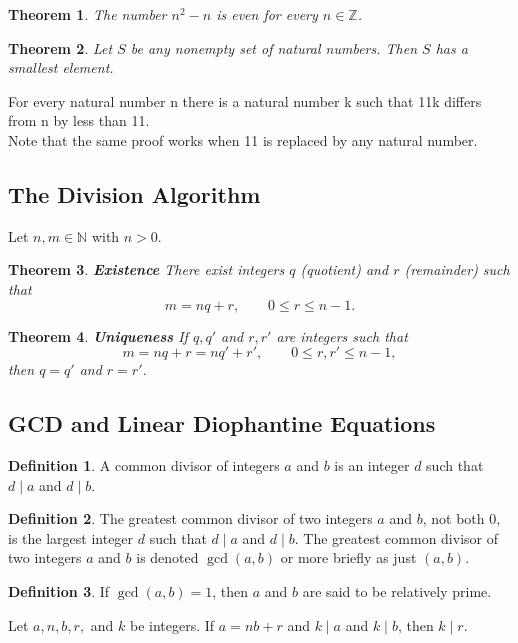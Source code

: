 \documentclass{article}
\newtheorem*{theorem*}{Theorem}
\theoremstyle{definition}
\newtheorem*{definition*}{Definition}
\newenvironment{manualtheorem}[1]{%
  \renewcommand{\thetheorem}{#1}%
  \theorem%
}{%
  \endtheorem%
}
\begin{document}
\begin{theorem*}
	The number $n^2 - n$ is even for every $n \in \mathbb{Z}$.
\end{theorem*}

\begin{theorem*}
	Let $S$ be any nonempty set of natural numbers. Then $S$ has a smallest element.
\end{theorem*}

\begin{manualtheorem}{1.27}
For every natural number n there is a natural number k such that 11k
differs from n by less than 11. \\Note that the same proof works when 11 is replaced by any natural number.
\end{manualtheorem}

\subsection{The Division Algorithm}
Let $n, m \in \mathbb{N}$ with $n > 0$.
\begin{theorem*}
	\textbf{Existence}
	There exist integers $q$ (quotient) and $r$ (remainder) such that
	\[
		m = nq + r, \qquad 0 \leq r \leq n - 1.
	\]
\end{theorem*}

\begin{theorem*}
	\textbf{Uniqueness}
	If $q, q'$ and $r, r'$ are integers such that
	\[
		m = nq + r = nq' + r', \qquad 0 \leq r, r' \leq n - 1,
	\]
	then $q = q'$ and $r = r'$.
\end{theorem*}


\subsection{GCD and Linear Diophantine Equations}

\begin{definition*}
	A common divisor of integers $a$ and $b$ is an integer $d$ such that $d \mid a$ and $d \mid b$.
\end{definition*}

\begin{definition*}
	The greatest common divisor of two integers $a$ and $b$, not both $0$, is the largest integer $d$ such that $d \mid a$ and $d \mid b$. The greatest common divisor of two integers $a$ and $b$ is denoted $\gcd(a, b)$ or more briefly as just $(a, b)$.
\end{definition*}

\begin{definition*}
	If $\gcd(a, b) = 1$, then $a$ and $b$ are said to be relatively prime.
\end{definition*}
\begin{manualtheorem}{1.32}
Let $a, n, b, r,$ and $k$ be integers. If $a = nb + r$ and $k \mid a$ and $k \mid b$,
then $k \mid r$.
\end{manualtheorem}
\end{document}
